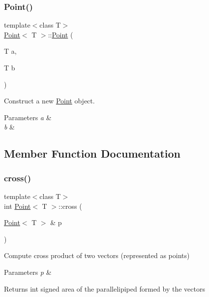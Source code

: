 \subsubsection{\texorpdfstring{Point()}{Point()}\hspace{0.1cm}{\footnotesize\ttfamily [2/2]}}
{\footnotesize\ttfamily template$<$class T$>$ \\
\mbox{\hyperlink{classPoint}{Point}}$<$ T $>$\+::\mbox{\hyperlink{classPoint}{Point}} (\begin{DoxyParamCaption}\item[{T}]{a,  }\item[{T}]{b }\end{DoxyParamCaption})\hspace{0.3cm}{\ttfamily [inline]}}



Construct a new \mbox{\hyperlink{classPoint}{Point}} object. 


\begin{DoxyParams}{Parameters}
{\em a} & \\
\hline
{\em b} & \\
\hline
\end{DoxyParams}


\subsection{Member Function Documentation}
\mbox{\label{classPoint_ad78df2e18b6b279889e0aee12fe05cc1}} 
\subsubsection{\texorpdfstring{cross()}{cross()}}
{\footnotesize\ttfamily template$<$class T$>$ \\
int \mbox{\hyperlink{classPoint}{Point}}$<$ T $>$\+::cross (\begin{DoxyParamCaption}\item[{\mbox{\hyperlink{classPoint}{Point}}$<$ T $>$ \&}]{p }\end{DoxyParamCaption})\hspace{0.3cm}{\ttfamily [inline]}}



Compute cross product of two vectors (represented as points) 


\begin{DoxyParams}{Parameters}
{\em p} & \\
\hline
\end{DoxyParams}
\begin{DoxyReturn}{Returns}
int signed area of the parallelipiped formed by the vectors 
\end{DoxyReturn}
\mbox{\label{classPoint_aae9fe5d91cff10489624a97c06943031}} 
